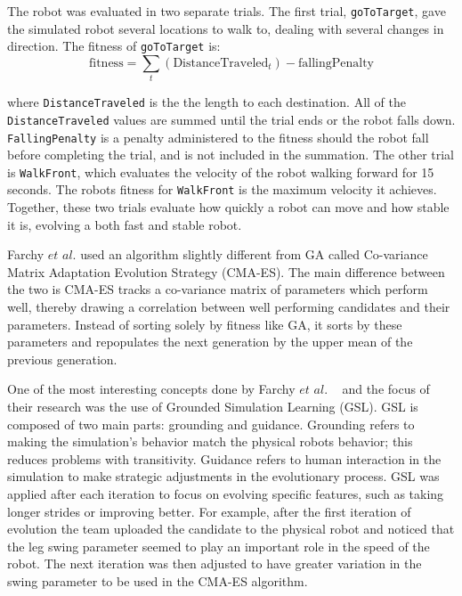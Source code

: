 \documentclass{sig-alternate}
\begin{document}
 The robot was evaluated in two separate trials. The first trial, {\tt goToTarget}, gave the simulated robot several locations to walk to, dealing with several changes in direction. The fitness of {\tt goToTarget} is:
\[
  \textrm{fitness} = \sum_{t} (\textrm{DistanceTraveled}_t) - \textrm{fallingPenalty}
\] 

 where {\tt DistanceTraveled} is the the length to each destination. All of the {\tt DistanceTraveled} values are summed until the trial ends or the robot falls down. {\tt FallingPenalty} is a penalty administered to the fitness should the robot fall before completing the trial, and is not included in the summation. The other trial is {\tt WalkFront}, which evaluates the velocity of the robot walking forward for 15 seconds. The robots fitness for {\tt WalkFront} is the maximum velocity it achieves. Together, these two trials evaluate how quickly a robot can move and how stable it is, evolving a both fast and stable robot.
  
  Farchy $et$ $al.$ used an algorithm slightly different from GA called Co-variance Matrix Adaptation Evolution Strategy (CMA-ES). The main difference between the two is CMA-ES tracks a co-variance matrix of parameters which perform well, thereby drawing a correlation between well performing candidates and their parameters. Instead of sorting solely by fitness like GA, it sorts by these parameters and repopulates the next generation by the upper mean of the previous generation.
  
  One of the most interesting concepts done by Farchy $et$ $al.$ ~\cite{Farchy:2013:HRL:2484920.2484930} and the focus of their research was the use of Grounded Simulation Learning (GSL). GSL is composed of two main parts: grounding and guidance. Grounding refers to making the simulation's behavior match the physical robots behavior; this reduces problems with transitivity. Guidance refers to human interaction in the simulation to make strategic adjustments in the evolutionary process. GSL was applied after each iteration to focus on evolving specific features, such as taking longer strides or improving better. For example, after the first iteration of evolution the team uploaded the candidate to the physical robot and noticed that the leg swing parameter seemed to play an important role in the speed of the robot. The next iteration was then adjusted to have greater variation in the swing parameter to be used in the CMA-ES algorithm. 
\end{document}
